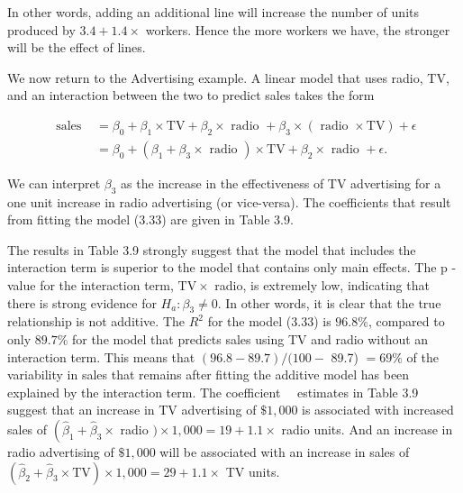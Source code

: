 \documentclass[10pt]{article}
\begin{document}
In other words, adding an additional line will increase the number of units produced by $3.4+1.4 \times$ workers. Hence the more workers we have, the stronger will be the effect of lines.

We now return to the Advertising example. A linear model that uses radio, TV, and an interaction between the two to predict sales takes the form


\begin{align*}
\text { sales } & =\beta_{0}+\beta_{1} \times \mathrm{TV}+\beta_{2} \times \text { radio }+\beta_{3} \times(\text { radio } \times \mathrm{TV})+\epsilon \\
& =\beta_{0}+\left(\beta_{1}+\beta_{3} \times \text { radio }\right) \times \mathrm{TV}+\beta_{2} \times \text { radio }+\epsilon . \tag{3.33}
\end{align*}


We can interpret $\beta_{3}$ as the increase in the effectiveness of TV advertising for a one unit increase in radio advertising (or vice-versa). The coefficients that result from fitting the model (3.33) are given in Table 3.9.

The results in Table 3.9 strongly suggest that the model that includes the interaction term is superior to the model that contains only main effects. The p -value for the interaction term, $\mathrm{TV} \times$ radio, is extremely low, indicating that there is strong evidence for $H_{a}: \beta_{3} \neq 0$. In other words, it is clear that the true relationship is not additive. The $R^{2}$ for the model (3.33) is $96.8 \%$, compared to only $89.7 \%$ for the model that predicts sales using TV and radio without an interaction term. This means that $(96.8-89.7) /(100-$ 89.7) $=69 \%$ of the variability in sales that remains after fitting the additive model has been explained by the interaction term. The coefficient\
\
estimates in Table 3.9 suggest that an increase in TV advertising of $\$ 1,000$ is associated with increased sales of $\left(\hat{\beta}_{1}+\hat{\beta}_{3} \times\right.$ radio $) \times 1,000=19+1.1 \times$ radio units. And an increase in radio advertising of $\$ 1,000$ will be associated with an increase in sales of $\left(\hat{\beta}_{2}+\hat{\beta}_{3} \times \mathrm{TV}\right) \times 1,000=29+1.1 \times$ TV units.
\end{document}
